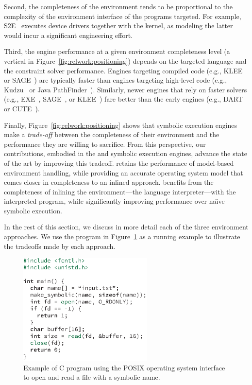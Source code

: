Second, the completeness of the environment tends to be proportional to the complexity of the environment interface of the programs targeted.
%
For example, S2E~\cite{s2eSystem} executes device drivers together with the kernel, as modeling the latter would incur a significant engineering effort.

Third, the engine performance at a given environment completeness level (a vertical in Figure~\ref{fig:relwork:positioning}) depends on the targeted language and the constraint solver performance.
%
Engines targeting compiled code (e.g., KLEE~\cite{klee} or SAGE~\cite{godefroid:fuzz}) are typically faster than engines targeting high-level code (e.g., Kudzu~\cite{saxena-kudzu} or Java PathFinder~\cite{jpf-symbex}).
%
Similarly, newer engines that rely on faster solvers (e.g., EXE~\cite{exe}, SAGE~\cite{godefroid:fuzz}, or KLEE~\cite{klee}) fare better than the early engines (e.g., DART~\cite{dart} or CUTE~\cite{cute}).

Finally, Figure~\ref{fig:relwork:positioning} shows that symbolic execution engines make a \emph{trade-off} between the completeness of their environment and the performance they are willing to sacrifice.
%
From this perspective, our contributions, embodied in the \chef and \cnine symbolic execution engines, advance the state of the art by improving this tradeoff.
%
\cnine retains the performance of model-based environment handling, while providing an accurate operating system model that comes closer in completeness to an inlined approach.
%
\chef benefits from the completeness of inlining the environment---the language interpreter---with the interpreted program, while significantly improving performance over na\"{\i}ve symbolic execution.

In the rest of this section, we discuss in more detail each of the three environment approaches.
%
We use the program in Figure~\ref{fig:relwork:example} as a running example to illustrate the tradeoffs made by each approach.

\begin{figure}
  \centering
  \includegraphics[width=0.6\textwidth]{relatedwork/figures/environment-example}
  \caption{Example of C program using the POSIX operating system interface to open and read a file with a symbolic name.}
  \label{fig:relwork:example}
\end{figure}

